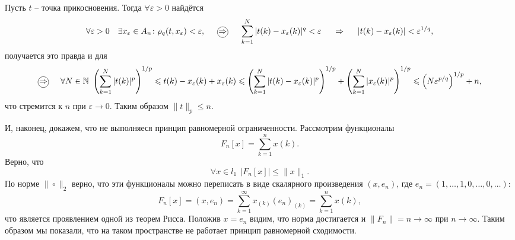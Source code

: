 Пусть $t$ -- точка прикосновения. Тогда $\forall \varepsilon > 0$ найдётся 
\begin{equation*}
    \forall\varepsilon > 0 \ \ \ 
    \exists x_\varepsilon \in A_n \colon 
    \rho_q (t, x_\varepsilon) < \varepsilon,
    \hspace{0.5cm} \encircled{\Rightarrow} \hspace{0.5cm}
    \sum_{k=1}^{N} |t(k) - x_\varepsilon(k)|^q < \varepsilon
    \hspace{0.5cm} \Rightarrow \hspace{0.5cm}
    |t(k) - x_\varepsilon (k)|< \varepsilon^{1/q},
\end{equation*}
получается это правда и для
\begin{equation*}
    \encircled{\Rightarrow} \hspace{5 mm}
    \forall N \in \mathbb{N} \ 
    \left(
        \sum_{k=1}^{N} |t(k)|^p
    \right)^{1/p} \leq t(k) - x_\varepsilon (k) + x_\varepsilon(k) 
    \leq
    \left(
        \sum_{k=1}^{N} |t(k) - x_\varepsilon (k)|^p
    \right)^{1/p}  + 
    \left(
        \sum_{k=1}^{N} |x_\varepsilon (k)|^p
    \right)^{1/p} \leq 
    \left(
        N \varepsilon^{p/q}
    \right)^{1/p} + n,
\end{equation*}
что стремится к $n$ при $\varepsilon \to 0$. Таким образом $\|t\|_p \leq n$. 


И, наконец, докажем, что не выполняеся принцип равномерной ограниченности. Рассмотрим функционалы
\begin{equation*}
    F_n [x] = \sum_{k=1}^{n} x(k).
\end{equation*}
Верно, что
\begin{equation*}
    \forall x \in l_1 \ \ 
    |F_n[x]| \leq \|x\|_1.
\end{equation*}
По норме $\|\circ\|_2$ верно, что эти функционалы можно переписать в виде скалярного произведения $(x, e_n)$, где $e_n = (1, \ldots, 1, 0,\ldots,0,\ldots)$:
\begin{equation*}
    F_n [x] = (x, e_n) = \sum_{k=1}^{\infty}  x_{(k)} (e_n)_{(k)} = \sum_{k=1}^{n} x(k),
\end{equation*}
что является проявлением одной из теорем Рисса. Положив $x=e_n$ видим, что норма достигается и $\|F_n\| = n \to \infty$ при $n \to \infty$. Таким образом мы показали, что на таком пространстве не работает принцип равномерной сходимости. 




